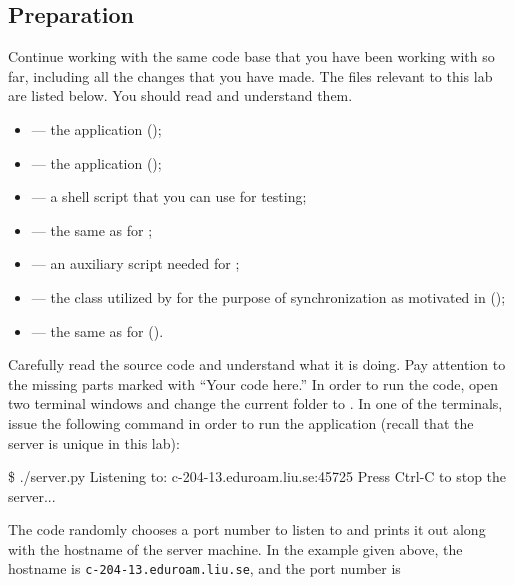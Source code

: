 \documentclass[a4paper]{article}
\begin{document}
\subsection{Preparation}
Continue working with the same code base that you have been working with so far,
including all the changes that you have made. The files relevant to this lab are
listed below. You should read and understand them.
\begin{itemize}

  \item {} --- the  application (\fix);

  \item {} --- the  application (\fix);

  \item {} --- a shell script that you can use for testing;

  \item {} --- the same as for ;

  \item {} --- an auxiliary script needed for
  ;

  \item {} --- the class utilized
  by  for the purpose of synchronization as motivated in
   (\leave);

  \item {} --- the same as for 
  (\overwrite).

\end{itemize}
Carefully read the source code and understand what it is doing. Pay
attention to the missing parts marked with ``Your code here.'' In order to run
the code, open two terminal windows and change the current folder to
. In one of the terminals, issue the following command in order
to run the  application (recall that the server is unique in
this lab):
\begin{shell}
\$ ./server.py
Listening to: c-204-13.eduroam.liu.se:45725
Press Ctrl-C to stop the server...
\end{shell}
The code randomly chooses a port number to listen to and prints it out along
with the hostname of the server machine. In the example given above, the
hostname is \texttt{c-204-13.eduroam.liu.se}, and the port number is
\end{document}
